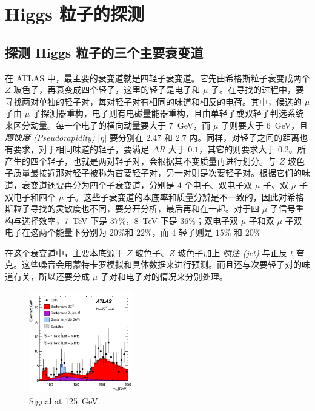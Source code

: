 \chapter{Higgs 粒子的探测}

\section{探测 Higgs 粒子的三个主要衰变道}

在 ATLAS 中，最主要的衰变道就是四轻子衰变道。它先由希格斯粒子衰变成两个 $Z$ 玻色子，再衰变成四个轻子，这里的轻子是电子和 $\mu$ 子。在寻找的过程中，要寻找两对单独的轻子对，每对轻子对有相同的味道和相反的电荷。其中，候选的 $\mu$ 子由 $\mu$ 子探测器重构，电子则有电磁量能器重构，且由单轻子或双轻子判选系统来区分动量。每一个电子的横向动量要大于 \qty{7}{GeV}，而 $\mu$ 子则要大于 \qty{6}{GeV}，且 \emph{赝快度 (Pseudorapidity)} $|\eta|$ 要分别在 $2.47$ 和 $2.7$ 内。同样，对轻子之间的距离也有要求，对于相同味道的轻子，要满足 $\Delta R$ 大于 $0.1$，其它的则要求大于 $0.2$。所产生的四个轻子，也就是两对轻子对，会根据其不变质量再进行划分。与 $Z$ 玻色子质量最接近那对轻子被称为首要轻子对，另一对则是次要轻子对。根据它们的味道，衰变道还要再分为四个子衰变道，分别是 $4$ 个电子、双电子双 $\mu$ 子、双 $\mu$ 子双电子和四个 $\mu$ 子。这些子衰变道的本底率和质量分辨是不一致的，因此对希格斯粒子寻找的灵敏度也不同，要分开分析，最后再和在一起。对于四 $\mu$ 子信号重构与选择效率，\qty{7}{TeV} 下是 $37\%$，\qty{8}{TeV} 下是 $36\%$；双电子双 $\mu$ 子和双 $\mu$ 子双电子在这两个能量下分别为 $20\%$和 $22\%$，而 $4$ 轻子则是 $15\%$ 和 $20\%$

在这个衰变道中，主要本底源于 $Z$ 玻色子、$Z$ 玻色子加上 \emph{喷注 (jet)} 与正反 $t$ 夸克。这些噪音会用蒙特卡罗模拟和具体数据来进行预测。而且还与次要轻子对的味道有关，所以还要分成 $\mu$ 子对和电子对的情况来分别处理。

\begin{figure}[htbp]
    \centering
    \includegraphics[width=0.4\textwidth]{pic/events.png}
    \caption{Signal at \qty{125}{GeV}.}
    \label{fig:events}
\end{figure}

